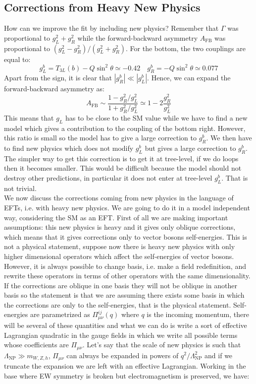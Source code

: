 \documentclass[../main.tex]{subfiles}
\begin{document}
\subsection{Corrections from Heavy New Physics}
How can we improve the fit by including new physics? Remember that $\Gamma$ was proportional to $g_L^2+g_R^2$ while the forward-backward asymmetry $A_{\text{FB}}$ was proportional to $(g_L^2-g_R^2)/(g_L^2+g_R^2)$. For the bottom, the two couplings are equal to:
\[
g_L^b=T_{3L}(b)-Q\sin^2\theta\simeq-0.42 \quad g_R^b=-Q\sin^2\theta\simeq0.077
\]
Apart from the sign, it is clear that $|g_R^b|\ll|g_L^b|$. Hence, we can expand the forward-backward asymmetry as:
\[
A_{\text{FB}}\sim\frac{1-g_R^2/g_L^2}{1+g_R^2/g_L^2}\simeq1-2\frac{g_R^2}{g_L^2}
\]
This means that $g_L$ has to be close to the SM value while we have to find a new model which gives a contribution to the coupling of the bottom right. However, this ratio is small so the model has to give a large correction to $g_R^b$. We then have to find new physics which does not modify $g_L^b$ but gives a large correction to $g_R^b$. The simpler way to get this correction is to get it at tree-level, if we do loops then it becomes smaller. This would be difficult because the model should not destroy other predictions, in particular it does not enter at tree-level $g_L^b$. That is not trivial.\\
We now discuss the corrections coming from new physics in the language of EFTs, i.e. with heavy new physics. We are going to do it in a model independent way, considering the SM as an EFT. First of all we are making important assumptions: this new physics is heavy and it gives only oblique corrections, which means that it gives corrections only to vector bosons self-energies. This is not a physical statement, suppose now there is heavy new physics with only higher dimensional operators which affect the self-energies of vector bosons. However, it is always possible to change basis, i.e. make a field redefinition, and rewrite these operators in terms of other operators with the same dimensionality. If the corrections are oblique in one basis they will not be oblique in another basis so the statement is that we are assuming there exists some basis in which the corrections are only to the self-energies, that is the physical statement. Self-energies are parametrized as $\Pi_{\mu\nu}^{ij}(q)$ where $q$ is the incoming momentum, there will be several of these quantities and what we can do is write a sort of effective Lagrangian quadratic in the gauge fields in which we write all possible terms whose coefficients are $\Pi_{\mu\nu}$. Let's say that the scale of new physics is such that $\Lambda_{\text{NP}}\gg m_{W,Z,h}$, $\Pi_{\mu\nu}$ can always be expanded in powers of $q^2/\Lambda_{\text{NP}}^2$ and if we truncate the expansion we are left with an effective Lagrangian. Working in the base where EW symmetry is broken but electromagnetism is preserved, we have:
\end{document}
